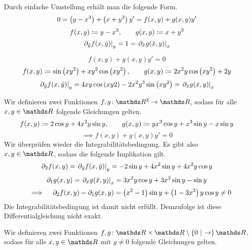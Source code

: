 \begin{atiSolution}
  \begin{atiSubtaskSolutions}
    \item[\localref{a}]{
      \begin{atiSubtaskSolutions}
        \item[\localref{ai}]{
          Durch einfache Umstellung erhält man die folgende Form.
          \[
            0 = \left( y-x^3 \right) + \left( x+y^3 \right)y' = f(x,y) + g(x,y)y'
          \]
          \[
            f(x,y)\coloneqq y-x^3,\qquad g(x,y)\coloneqq x+y^3
          \]
          \[
            \left.\partial_{\tilde{y}} f(x,\tilde{y})\right\vert_{y}^{} = 1 = \left.\partial_{\tilde{x}} g(\tilde{x},y)\right\vert_{x}^{}
          \]
        }
        \item[\localref{aii}]{
          \[
            f(x,y) + g(x,y)y' = 0
          \]
          \[
            f(x,y) \coloneqq \sin\left( xy^2 \right) + xy^2\cos\left( xy^2 \right) ,\qquad g(x,y) \coloneqq 2x^2y\cos\left( xy^2 \right) + 2y
          \]
          \[
            \left.\partial_{\tilde{y}} f(x,\tilde{y})\right\vert_{y}^{} = 4xy\cos\left( xy2 \right) - 2x^2y^3\sin\left( xy^2 \right) = \left.\partial_{\tilde{x}} g(\tilde{x},y)\right\vert_{x}^{}
          \]
        }
      \end{atiSubtaskSolutions}
    }
    \item[\localref{b}]{
      \begin{atiSubtaskSolutions}
        \item[\localref{bi}]{
          Wir definieren zwei Funktionen $\func{f,g}{\setR^2}{\setR}$, sodass für alle $x,y\in\setR$ folgende Gleichungen gelten.
          \[
            f(x,y) \coloneqq 2\cos y + 4x^2y\sin y ,\qquad g(x,y) \coloneqq yx^3\cos y + x^3\sin y - x\sin y
          \]
          \[
            \implies f(x,y) + g(x,y)y' = 0
          \]
          Wir überprüfen wieder die Integrabilitätsbedingung.
          Es gibt also $x,y\in\setR$, sodass die folgende Implikation gilt.
          \[
            \partial_2f(x,y) = \left.\partial_{\tilde{y}} f(x,\tilde{y})\right\vert_{y}^{} = -2\sin y + 4x^2\sin y + 4x^2y\cos y
          \]
          \[
            \partial_1g(x,y) = \left.\partial_{\tilde{x}} g(\tilde{x},y)\right\vert_{x}^{} = 3x^2y\cos y + 3x^2\sin y - \sin y
          \]
          \[
            \implies \partial_2f(x,y) - \partial_1g(x,y) = \curvb{x^2-1}\sin y + \curvb{1-3x^2}y\cos y \neq 0
          \]
          Die Integrabilitätsbedingung ist damit nicht erfüllt.
          Demzufolge ist diese Differentialgleichung nicht exakt.
        }
        \item[\localref{bii}]{
          Wir definieren zwei Funktionen $\func{f,g}{\setR\times\setR\setminus\set{0}}{\setR}$, sodass für alle $x,y\in\setR$ mit $y\neq 0$ folgende Gleichungen gelten.
}
\end{atiSubtaskSolutions}}
\end{atiSubtaskSolutions}
\end{atiSolution}
